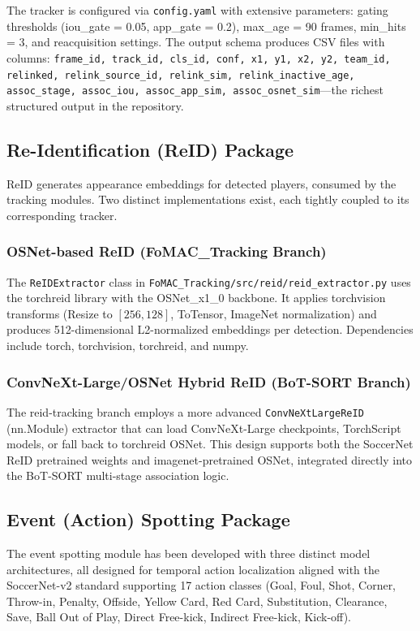 \documentclass[10pt,twocolumn,a4paper]{article}
\begin{document}
The tracker is configured via \texttt{config.yaml} with extensive parameters: gating thresholds (iou\_gate = 0.05, app\_gate = 0.2), max\_age = 90 frames, min\_hits = 3, and reacquisition settings. The output schema produces CSV files with columns: \texttt{frame\_id, track\_id, cls\_id, conf, x1, y1, x2, y2, team\_id, relinked, relink\_source\_id, relink\_sim, relink\_inactive\_age, assoc\_stage, assoc\_iou, assoc\_app\_sim, assoc\_osnet\_sim}---the richest structured output in the repository.

\subsection{Re-Identification (ReID) Package}

ReID generates appearance embeddings for detected players, consumed by the tracking modules. Two distinct implementations exist, each tightly coupled to its corresponding tracker.

\subsubsection{OSNet-based ReID (FoMAC\_Tracking Branch)}
The \texttt{ReIDExtractor} class in \texttt{FoMAC\_Tracking/src/reid/reid\_extractor.py} uses the torchreid library with the OSNet\_x1\_0 backbone. It applies torchvision transforms (Resize to $[256, 128]$, ToTensor, ImageNet normalization) and produces 512-dimensional L2-normalized embeddings per detection. Dependencies include torch, torchvision, torchreid, and numpy.

\subsubsection{ConvNeXt-Large/OSNet Hybrid ReID (BoT-SORT Branch)}
The reid-tracking branch employs a more advanced \texttt{ConvNeXtLargeReID} (nn.Module) extractor that can load ConvNeXt-Large checkpoints, TorchScript models, or fall back to torchreid OSNet. This design supports both the SoccerNet ReID pretrained weights and imagenet-pretrained OSNet, integrated directly into the BoT-SORT multi-stage association logic.

\subsection{Event (Action) Spotting Package}

The event spotting module has been developed with three distinct model architectures, all designed for temporal action localization aligned with the SoccerNet-v2 standard supporting 17 action classes (Goal, Foul, Shot, Corner, Throw-in, Penalty, Offside, Yellow Card, Red Card, Substitution, Clearance, Save, Ball Out of Play, Direct Free-kick, Indirect Free-kick, Kick-off).
\end{document}
